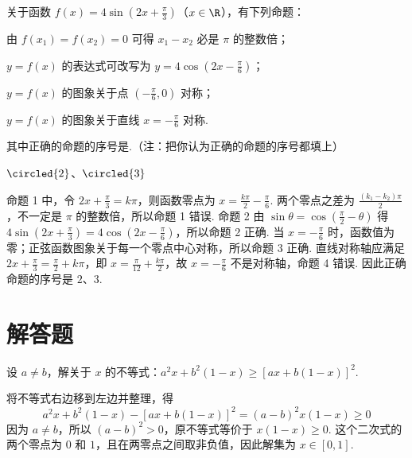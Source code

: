 \documentclass[UTF8,a4paper,oneside,11pt]{ctexbook}
\begin{document}
\begin{problem}
关于函数 \(f(x)=4\sin \left(2x+\frac{\pi}{3}\right)\)（\(x\in\R\)），有下列命题：
\begin{circlelist}
\item 由 \(f(x_{1}) = f(x_{2}) = 0\) 可得 \(x_{1} - x_{2}\) 必是 \(\pi\) 的整数倍；
\item \(y = f(x)\) 的表达式可改写为 \(y = 4\cos \left(2x - \frac{\pi}{6}\right)\)；
\item \(y = f(x)\) 的图象关于点 \(\left(-\frac{\pi}{6},0\right)\) 对称；
\item \(y = f(x)\) 的图象关于直线 \(x = -\frac{\pi}{6}\) 对称.
\end{circlelist}
其中正确的命题的序号是\fillinblank{}.（注：把你认为正确的命题的序号都填上）
\end{problem}

\begin{answer}
\(\circled{2}\)、\(\circled{3}\)
\end{answer}

\begin{solution}
命题 1 中，令 \(2x+\frac{\pi}{3}=k\pi\)，则函数零点为 \(x=\frac{k\pi}{2}-\frac{\pi}{6}\). 两个零点之差为 \(\frac{(k_1-k_2)\pi}{2}\)，不一定是 \(\pi\) 的整数倍，所以命题 1 错误. 命题 2 由 \(\sin\theta=\cos\left(\frac{\pi}{2}-\theta\right)\) 得 \(4\sin\left(2x+\frac{\pi}{3}\right)=4\cos\left(2x-\frac{\pi}{6}\right)\)，所以命题 2 正确. 当 \(x=-\frac{\pi}{6}\) 时，函数值为零；正弦函数图象关于每一个零点中心对称，所以命题 3 正确. 直线对称轴应满足 \(2x+\frac{\pi}{3}=\frac{\pi}{2}+k\pi\)，即 \(x=\frac{\pi}{12}+\frac{k\pi}{2}\)，故 \(x=-\frac{\pi}{6}\) 不是对称轴，命题 4 错误. 因此正确命题的序号是 \(2\)、\(3\).
\end{solution}

\section{解答题}

\begin{problem}
设 \(a \neq b\)，解关于 \(x\) 的不等式：\(a^2 x + b^2 (1 - x) \geqslant [a x + b(1 - x)]^2\).
\end{problem}

\begin{solution}
将不等式右边移到左边并整理，得
\[
a^2x+b^2(1-x)-\left[ax+b(1-x)\right]^2=(a-b)^2x(1-x)\geqslant0
\]
因为 \(a\neq b\)，所以 \((a-b)^2>0\)，原不等式等价于 \(x(1-x)\geqslant0\). 这个二次式的两个零点为 \(0\) 和 \(1\)，且在两零点之间取非负值，因此解集为 \(x\in[0,1]\).
\end{solution}
\end{document}
